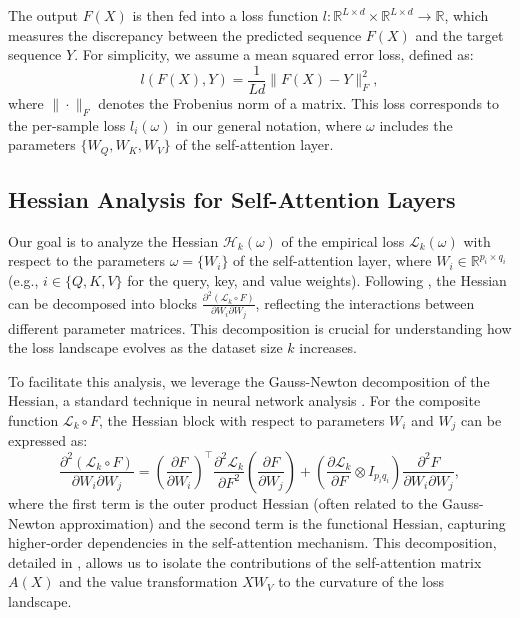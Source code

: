 \documentclass{article}
\begin{document}
The output $F(X)$ is then fed into a loss function $l : \mathbb{R}^{L \times d} \times \mathbb{R}^{L \times d} \to \mathbb{R}$, which measures the discrepancy between the predicted sequence $F(X)$ and the target sequence $Y$. For simplicity, we assume a mean squared error loss, defined as:
\[
l(F(X), Y) = \frac{1}{L d} \| F(X) - Y \|_F^2,
\]
where $\| \cdot \|_F$ denotes the Frobenius norm of a matrix. This loss corresponds to the per-sample loss $l_i(\omega)$ in our general notation, where $\omega$ includes the parameters $\{W_Q, W_K, W_V\}$ of the self-attention layer.

\subsection{Hessian Analysis for Self-Attention Layers}
Our goal is to analyze the Hessian $\mathcal{H}_k(\omega)$ of the empirical loss $\mathcal{L}_k(\omega)$ with respect to the parameters $\omega = \{W_i\}$ of the self-attention layer, where $W_i \in \mathbb{R}^{p_i \times q_i}$ (e.g., $i \in \{Q, K, V\}$ for the query, key, and value weights). Following \cite{ormaniec2024attentionhessian}, the Hessian can be decomposed into blocks $\frac{\partial^2 (\mathcal{L}_k \circ F)}{\partial W_i \partial W_j}$, reflecting the interactions between different parameter matrices. This decomposition is crucial for understanding how the loss landscape evolves as the dataset size $k$ increases.

To facilitate this analysis, we leverage the Gauss-Newton decomposition of the Hessian, a standard technique in neural network analysis \cite{ormaniec2024attentionhessian}. For the composite function $\mathcal{L}_k \circ F$, the Hessian block with respect to parameters $W_i$ and $W_j$ can be expressed as:
\[
\frac{\partial^2 (\mathcal{L}_k \circ F)}{\partial W_i \partial W_j} = \left( \frac{\partial F}{\partial W_i} \right)^\top \frac{\partial^2 \mathcal{L}_k}{\partial F^2} \left( \frac{\partial F}{\partial W_j} \right) + \left( \frac{\partial \mathcal{L}_k}{\partial F} \otimes I_{p_i q_i} \right) \frac{\partial^2 F}{\partial W_i \partial W_j},
\]
where the first term is the outer product Hessian (often related to the Gauss-Newton approximation) and the second term is the functional Hessian, capturing higher-order dependencies in the self-attention mechanism. This decomposition, detailed in \cite{ormaniec2024attentionhessian}, allows us to isolate the contributions of the self-attention matrix $A(X)$ and the value transformation $X W_V$ to the curvature of the loss landscape.
\end{document}
